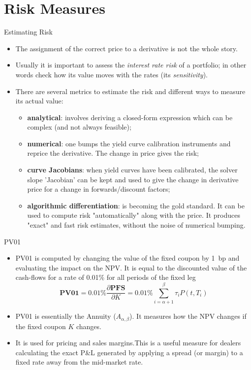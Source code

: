 \documentclass{beamer}
\begin{document}
\section{Risk Measures}
\begin{frame}{Estimating Risk}
\begin{itemize}
\item The assignment of the correct price to a derivative is not the whole story.
\item Usually it is important to assess the \emph{interest rate risk} of a portfolio; in other words check how its value moves with the rates (its \emph{sensitivity}).
\item There are several metrics to estimate the risk and different ways to measure its actual value:
\begin{itemize}
	\item \textbf{analytical}: involves deriving a closed-form expression which can be complex (and not always feasible);
	\item \textbf{numerical}: one bumps the yield curve calibration instruments and reprice the derivative. The change in price gives the risk;
	\item \textbf{curve Jacobians}: when yield curves have been calibrated, the solver slope 'Jacobian' can be kept and used to give the change in derivative price for a change in forwards/discount factors;
	\item \textbf{algorithmic differentiation}: is becoming the gold standard. It can be used to compute risk "automatically" along with the price. It produces "exact" and fast risk estimates, without the noise of numerical bumping.
\end{itemize}

\end{itemize}
\end{frame}


\begin{frame}{PV01}
\begin{itemize}
\item<1-> \textcolor{maincolor}{PV01} is computed by changing the value of the fixed coupon by 1~bp and evaluating the impact on the NPV. It is equal to the discounted value of the cash-flows for a rate of 0.01\% for all periods of the fixed leg
\begin{equation}
	\textbf{PV01} = 0.01\% \frac{\partial \textbf{PFS}}{\partial K} = 0.01\% \sum_{i=\alpha+1}^\beta\tau_iP(t,T_i)
\end{equation}
\item<2-> PV01 is essentially the Annuity ($A_{\alpha,\beta}$). It measures how the NPV changes if the fixed coupon $K$ changes.
\item<3-> It is used for pricing and sales margins.This is a useful measure for dealers calculating the exact P\&L generated by applying a spread (or margin) to a fixed rate away from the mid-market rate.
\end{itemize}
\end{frame}
\end{document}
